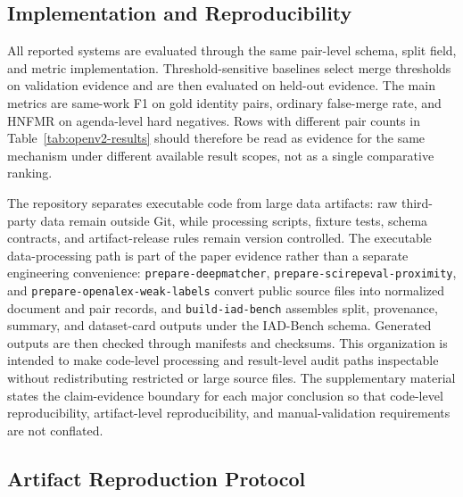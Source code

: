 \documentclass[11pt]{article}
\begin{document}
\subsection{Implementation and Reproducibility}

All reported systems are evaluated through the same pair-level schema, split field, and metric implementation. Threshold-sensitive baselines select merge thresholds on validation evidence and are then evaluated on held-out evidence. The main metrics are same-work F1 on gold identity pairs, ordinary false-merge rate, and HNFMR on agenda-level hard negatives. Rows with different pair counts in Table~\ref{tab:openv2-results} should therefore be read as evidence for the same mechanism under different available result scopes, not as a single comparative ranking.

The repository separates executable code from large data artifacts: raw third-party data remain outside Git, while processing scripts, fixture tests, schema contracts, and artifact-release rules remain version controlled. The executable data-processing path is part of the paper evidence rather than a separate engineering convenience: \texttt{prepare-deepmatcher}, \texttt{prepare-scirepeval-proximity}, and \texttt{prepare-openalex-weak-labels} convert public source files into normalized document and pair records, and \texttt{build-iad-bench} assembles split, provenance, summary, and dataset-card outputs under the IAD-Bench schema. Generated outputs are then checked through manifests and checksums. This organization is intended to make code-level processing and result-level audit paths inspectable without redistributing restricted or large source files. The supplementary material states the claim-evidence boundary for each major conclusion so that code-level reproducibility, artifact-level reproducibility, and manual-validation requirements are not conflated.

\subsection{Artifact Reproduction Protocol}
\end{document}
